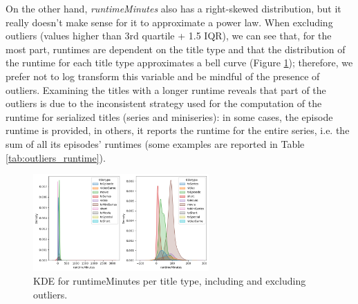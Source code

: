 On the other hand, \textit{runtimeMinutes} also has a right-skewed distribution, but it really doesn't make sense for it to approximate a power law. When excluding outliers (values higher than 3rd quartile + 1.5 IQR), we can see that, for the most part, runtimes are dependent on the title type and that the distribution of the runtime for each title type approximates a bell curve (Figure \ref{fig:kde_runtimeMinutes_doppio.png}); therefore, we prefer not to log transform this variable and be mindful of the presence of outliers. Examining the titles with a longer runtime reveals that part of the outliers is due to the inconsistent strategy used for the computation of the runtime for serialized titles (series and miniseries): in some cases, the episode runtime is provided, in others, it reports the runtime for the entire series, i.e. the sum of all its episodes' runtimes (some examples are reported in Table \ref{tab:outliers_runtime}).

\begin{figure}
    \centering
    \includegraphics[width=0.6\textwidth]{../../results/images/kde_runtimeMinutes_doppio.png}
    \caption{KDE for runtimeMinutes per title type, including and excluding outliers.}
    \label{fig:kde_runtimeMinutes_doppio.png}
\end{figure}


\begin{table}[h]
    \centering
    \caption{Top 5 titles with the longest runtime.}
    \label{tab:outliers_runtime}
\end{table}


